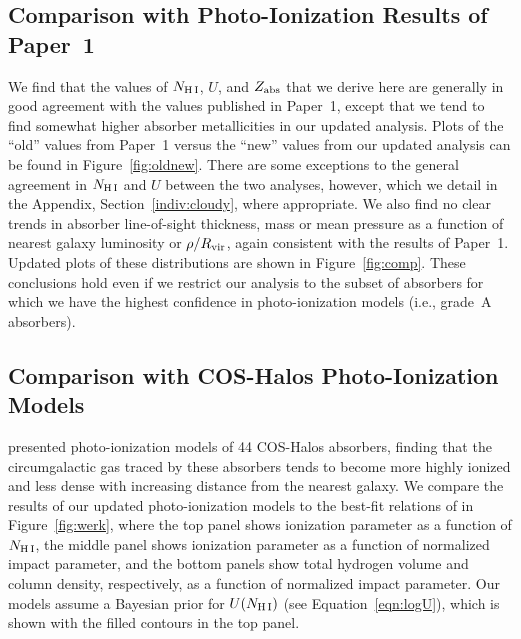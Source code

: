 \documentclass[twocolumn,twocolappendix,tighten,times]{aastex6}
\begin{document}
\subsection{Comparison with Photo-Ionization Results of Paper~1}
\label{cloudy:comp}

We find that the values of $N_{\rm H\,I}$, $U$, and $Z_{\rm abs}$ that we 
derive here are generally in good agreement with the values published in 
Paper~1, except that we tend to find somewhat higher absorber metallicities in 
our updated analysis. Plots of the ``old'' values from Paper~1 versus the 
``new'' values from our updated analysis can be found in Figure~\ref{fig:oldnew}.
There are some exceptions to the general agreement in $N_{\rm H\,I}$ and $U$ 
between the two analyses, however, which we detail in the Appendix, Section~\ref{indiv:cloudy},
where appropriate. We also find no clear trends in absorber line-of-sight 
thickness, mass or mean pressure as a function of nearest galaxy luminosity or 
$\rho/R_{\rm vir}$, again consistent with the results of Paper~1. 
Updated plots of these distributions are shown in Figure~\ref{fig:comp}. 
These conclusions hold even if we restrict our analysis to the subset of 
absorbers for which we have the highest confidence in photo-ionization models 
(i.e., grade~A absorbers).


\subsection{Comparison with COS-Halos Photo-Ionization Models}
\label{cloudy:coshalos}

\citet{werk14} presented photo-ionization models of 44 COS-Halos absorbers, 
finding that the circumgalactic gas traced by these absorbers tends to become 
more highly ionized and less dense with increasing distance from the nearest 
galaxy. We compare the results of our updated photo-ionization models to the 
best-fit relations of \citet{werk14} in Figure~\ref{fig:werk}, where the top 
panel shows ionization parameter as a function of $N_{\rm H\,I}$, the middle 
panel shows ionization parameter as a function of normalized impact parameter, 
and the bottom panels show total hydrogen volume and column density, 
respectively, as a function of normalized impact parameter. Our models assume 
a Bayesian prior for $U(N_{\rm H\,I})$ (see Equation~\ref{eqn:logU}), which is 
shown with the filled contours in the top panel. 
\end{document}
